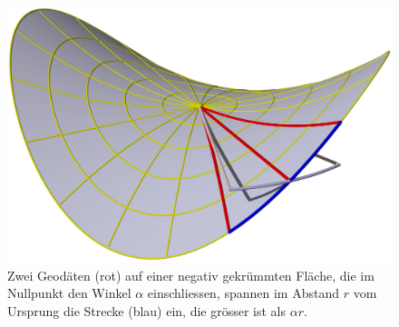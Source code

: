 %
\begin{figure}
\centering
\includegraphics[width=0.9\hsize]{chapters/3d/pringles-negativ.jpg}
\caption{Zwei Geodäten (rot) auf einer negativ gekrümmten Fläche,
die im Nullpunkt den Winkel $\alpha$ einschliessen, spannen im Abstand
$r$ vom Ursprung die Strecke (blau) ein, die grösser ist als
$\alpha r$.
\label{skript:pringles:negativ}}
\end{figure}
%
